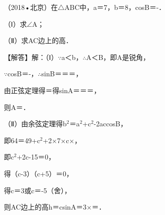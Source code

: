 \begin{question}
（2018•北京）在$\triangle$ABC中，a＝7，b＝8，cosB＝-\allowbreak{}．\par
（Ⅰ）求$\angle$A；\par
（Ⅱ）求AC边上的高．\par
\begin{solution}
【解答】解：（Ⅰ）$\because$a＜b，$\therefore$A＜B，即A是锐角，\par
$\because$cosB＝-\allowbreak{}，$\therefore$sinB＝\allowbreak{}＝\allowbreak{}＝\allowbreak{}，\par
由正弦定理得\allowbreak{}＝\allowbreak{}得sinA＝\allowbreak{}＝\allowbreak{}＝\allowbreak{}，\par
则A＝\allowbreak{}．\par
（Ⅱ）由余弦定理得b$^{2}$＝a$^{2}$+c$^{2}$-2accosB，\par
即64＝49+c$^{2}$+2×7×c×\allowbreak{}，\par
即c$^{2}$+2c-15＝0，\par
得（c-3）（c+5）＝0，\par
得c＝3或c＝-5（舍），\par
则AC边上的高h＝csinA＝3×\allowbreak{}＝\allowbreak{}．\par
\end{solution}
\end{question}

